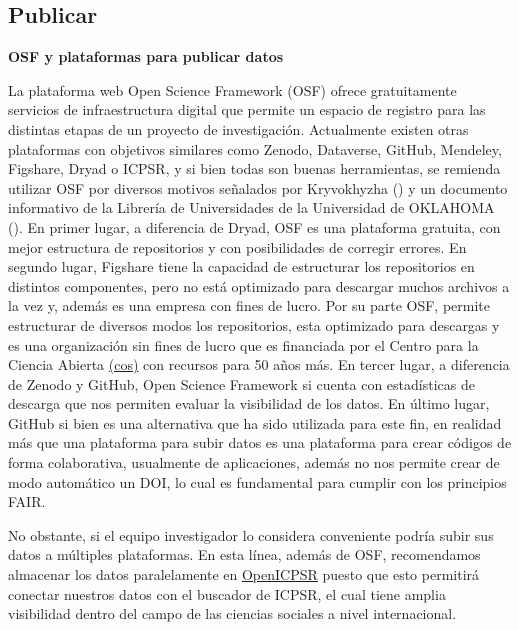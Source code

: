 \documentclass[
  spanish,
  a4paper,
  oneside]{scrbook}
\begin{document}
\subsection{\texorpdfstring{\textbf{Publicar}}{Publicar}}\label{publicar}

\textbf{OSF y plataformas para publicar datos}

La plataforma web Open Science Framework (OSF) ofrece gratuitamente
servicios de infraestructura digital que permite un espacio de registro
para las distintas etapas de un proyecto de investigación. Actualmente
existen otras plataformas con objetivos similares como Zenodo,
Dataverse, GitHub, Mendeley, Figshare, Dryad o ICPSR, y si bien todas
son buenas herramientas, se remienda utilizar OSF por diversos motivos
señalados por Kryvokhyzha () y
un documento informativo de la Librería de Universidades de la
Universidad de OKLAHOMA
(). En
primer lugar, a diferencia de Dryad, OSF es una plataforma gratuita, con
mejor estructura de repositorios y con posibilidades de corregir
errores. En segundo lugar, Figshare tiene la capacidad de estructurar
los repositorios en distintos componentes, pero no está optimizado para
descargar muchos archivos a la vez y, además es una empresa con fines de
lucro. Por su parte OSF, permite estructurar de diversos modos los
repositorios, esta optimizado para descargas y es una organización sin
fines de lucro que es financiada por el Centro para la Ciencia Abierta
\href{https://www.cos.io/}{(cos)} con recursos para 50 años más. En
tercer lugar, a diferencia de Zenodo y GitHub, Open Science Framework si
cuenta con estadísticas de descarga que nos permiten evaluar la
visibilidad de los datos. En último lugar, GitHub si bien es una
alternativa que ha sido utilizada para este fin, en realidad más que una
plataforma para subir datos es una plataforma para crear códigos de
forma colaborativa, usualmente de aplicaciones, además no nos permite
crear de modo automático un DOI, lo cual es fundamental para cumplir con
los principios FAIR.

No obstante, si el equipo investigador lo considera conveniente podría
subir sus datos a múltiples plataformas. En esta línea, además de OSF,
recomendamos almacenar los datos paralelamente en
\href{https://www.openicpsr.org/openicpsr/workspace?path=openICPSR}{OpenICPSR}
puesto que esto permitirá conectar nuestros datos con el buscador de
ICPSR, el cual tiene amplia visibilidad dentro del campo de las ciencias
sociales a nivel internacional.
\end{document}
